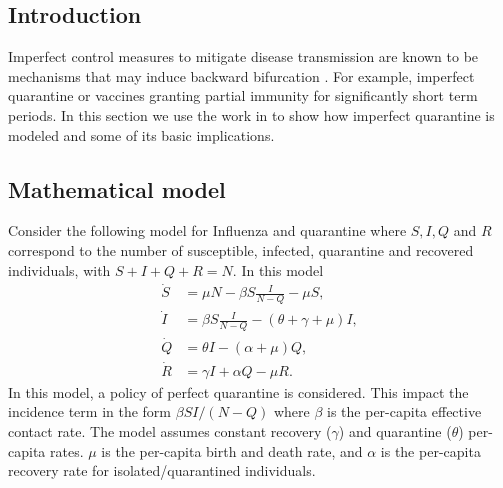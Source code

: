 \documentclass{book}
\begin{document}
\subsection*{Introduction}
Imperfect control measures to mitigate disease transmission are known to be mechanisms that may induce backward bifurcation \cite{gumel2012causes}. For example, imperfect quarantine or vaccines granting partial immunity for significantly short term periods.
In this section we use the work in \cite{erdem2017mathematical} to show how imperfect quarantine is modeled and some of its basic implications.

\subsection*{Mathematical model}
Consider the following model for Influenza and quarantine where $S, I, Q$ and $R$ correspond to the number of susceptible, infected, quarantine and recovered individuals, with $S+I+Q+R=N$. In this model
%
\begin{equation}
\begin{split}
  \dot{S} &= \mu N-\beta S \frac{I}{N-Q}-\mu S,\\
  \dot{I} &= \beta S \frac{I}{N-Q}-(\theta+\gamma+\mu) I,\\
  \dot{Q} &= \theta I-(\alpha+\mu) Q,\\
  \dot{R} &= \gamma I+\alpha Q-\mu R. 
  \end{split}
\end{equation}
%
In this model, a policy of perfect quarantine is considered. This impact the incidence term in the form $\beta S I /(N-Q)$ where $\beta$ is the per-capita effective contact rate.
%
The model assumes constant recovery ($\gamma$) and quarantine ($\theta$) per-capita rates. $\mu$ is the per-capita birth and death rate, and $\alpha$ is the per-capita recovery rate for isolated/quarantined individuals.
\end{document}
